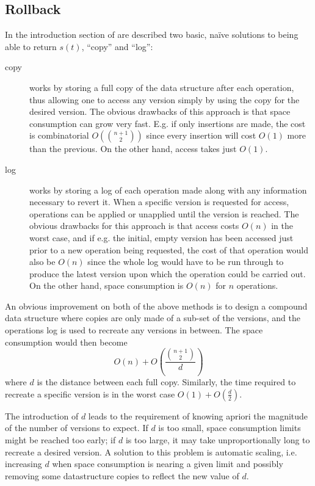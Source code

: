 \subsection{Rollback}

In the introduction section of \cite{Tsotras1995237} are described two basic,
na\"ive solutions to being able to return $s(t)$, ``copy'' and ``log'':
\begin{description}
  \item[copy] works by storing a full copy of the data structure after each
  operation, thus allowing one to access any version simply by using the copy
  for the desired version. The obvious drawbacks of this approach is that space
  consumption can grow very fast. E.g. if only insertions are made, the cost is
  combinatorial $O\left(\binom{n+1}{2}\right)$ since every insertion will cost
  $O(1)$ more than the previous. On the other hand, access takes just $O(1)$.
  \item[log] works by storing a log of each operation made along with any
  information necessary to revert it. When a specific version is requested for
  access, operations can be applied or unapplied until the version is reached. The
  obvious drawbacks for this approach is that access costs $O(n)$ in the worst
  case, and if e.g. the initial, empty version has been accessed just prior to a
  new operation being requested, the cost of that operation would also be $O(n)$
  since the whole log would have to be run through to produce the latest version
  upon which the operation could be carried out. On the other hand, space
  consumption is $O(n)$ for $n$ operations.
\end{description}

An obvious improvement on both of the above methods is to design a compound data
structure where copies are only made of a sub-set of the versions, and the
operations log is used to recreate any versions in between. The space
consumption would then become $$O(n)+O\left(\frac{\binom{n+1}{2}}{d}\right)$$
where $d$ is the distance between each full copy. Similarly, the time required
to recreate a specific version is in the worst case
$O(1)+O\left(\frac{d}{2}\right)$.

The introduction of $d$ leads to the requirement of knowing apriori the
magnitude of the number of versions to expect. If $d$ is too small, space
consumption limits might be reached too early; if $d$ is too large, it may take
unproportionally long to recreate a desired version. A solution to this problem
is automatic scaling, i.e. increasing $d$ when space consumption is nearing a
given limit and possibly removing some datastructure copies to reflect the new
value of $d$.

